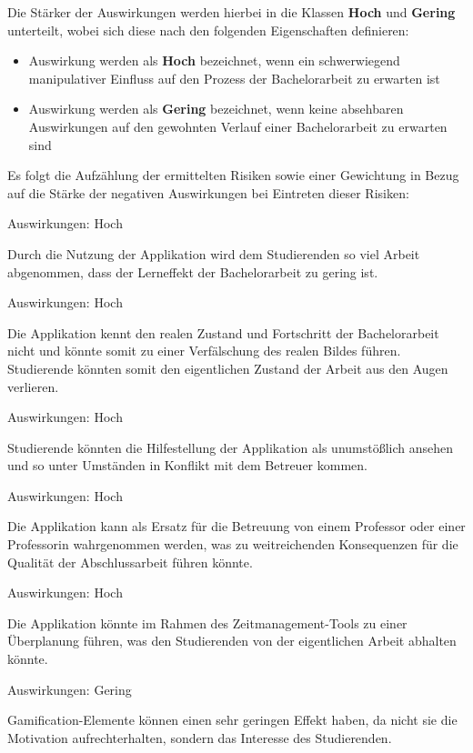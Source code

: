 \documentclass[bibliography=totoc,listof=totoc,BCOR=5mm,DIV=12,oneside]{scrbook}
\begin{document}
\par \bigskip Die Stärker der Auswirkungen werden hierbei in die Klassen \textbf{Hoch} und \textbf{Gering} unterteilt, wobei sich diese nach den folgenden Eigenschaften definieren:

\begin{itemize}
\item Auswirkung werden als \textbf{Hoch} bezeichnet, wenn ein schwerwiegend manipulativer Einfluss auf den Prozess der Bachelorarbeit zu erwarten ist

\item Auswirkung werden als \textbf{Gering} bezeichnet, wenn keine absehbaren Auswirkungen auf den gewohnten Verlauf einer Bachelorarbeit zu erwarten sind
\end{itemize}

\par \bigskip Es folgt die Aufzählung der ermittelten Risiken sowie einer Gewichtung in Bezug auf die Stärke der negativen Auswirkungen bei Eintreten dieser Risiken:

\begin{enumerate} [label=\textit{[R\arabic*]}]
\item \label{risk:keinLerneffekt} 
\par Auswirkungen: Hoch
\par Durch die Nutzung der Applikation wird dem Studierenden so viel Arbeit abgenommen, dass der Lerneffekt der Bachelorarbeit zu gering ist.
\item \label{risk:realerZustand} 
\par Auswirkungen: Hoch
\par Die Applikation kennt den realen Zustand und Fortschritt der Bachelorarbeit nicht und könnte somit zu einer Verfälschung des realen Bildes führen. Studierende könnten somit den eigentlichen Zustand der Arbeit aus den Augen verlieren.
\item \label{risk:inhaltUnumstoesslich} 
\par Auswirkungen: Hoch
\par Studierende könnten die Hilfestellung der Applikation als unumstößlich ansehen und so unter Umständen in Konflikt mit dem Betreuer kommen.
\item \label{risk:erstazBetreuer} 
\par Auswirkungen: Hoch
\par Die Applikation kann als Ersatz für die Betreuung von einem Professor oder einer Professorin wahrgenommen werden, was zu weitreichenden Konsequenzen für die Qualität der Abschlussarbeit führen könnte.
\item \label{risk:ueberplanung} 
\par Auswirkungen: Hoch
\par Die Applikation könnte im Rahmen des Zeitmanagement-Tools zu einer Überplanung führen, was den Studierenden von der eigentlichen Arbeit abhalten könnte.
\item \label{risk:gamificationEffekt} 
\par Auswirkungen: Gering
\par Gamification-Elemente können einen sehr geringen Effekt haben, da nicht sie die Motivation aufrechterhalten, sondern das Interesse des Studierenden.
\end{enumerate}
\end{document}
